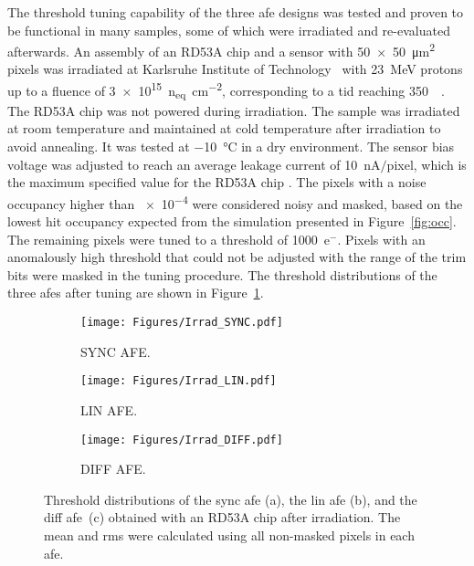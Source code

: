 The threshold tuning capability of the three \gls{afe} designs was tested and proven to be functional in many samples, some of which were irradiated and re-evaluated afterwards. An assembly of an RD53A chip and a sensor with \SI[product-units = power]{50x50}{\micro\meter\squared} pixels was irradiated at Karlsruhe Institute of Technology~\citep{kit} with \SI{23}{\mega\electronvolt} protons up to a fluence of \SI{3e15}{n_{eq}\per\centi\meter\squared}, corresponding to a \gls{tid} reaching \SI{350}{\mega\rad}. The RD53A chip was not powered during irradiation. The sample was irradiated at room temperature and maintained at cold temperature after irradiation to avoid annealing. It was tested at \SI{-10}{\celsius} in a dry environment. The sensor bias voltage was adjusted to reach an average leakage current of \SI{10}{\nano\ampere}$/$pixel, which is the maximum specified value for the RD53A chip \cite{rd53a_specs}.
The pixels with a noise occupancy higher than \num{e-4} were considered noisy and masked, based on the lowest hit occupancy expected from the simulation presented in Figure~\ref{fig:occ}. The remaining pixels were tuned to a threshold of \num{1000}~e${^{-}}$. Pixels with an anomalously high threshold that could not be adjusted with the range of the trim bits were masked in the tuning procedure. The threshold distributions of the three \gls{afe}s after tuning are shown in Figure~\ref{fig:irrad_3afes_thr}.

\begin{figure}[t]
    \centering
    \begin{subfigure}{0.32\textwidth}
        \centering
        \texttt{[image: Figures/Irrad\_SYNC.pdf]}
        \caption{SYNC AFE.}
    \end{subfigure}
    \hfill
    \begin{subfigure}{0.32\textwidth}
        \centering
        \texttt{[image: Figures/Irrad\_LIN.pdf]}
        \caption{LIN AFE.}
    \end{subfigure}
    \hfill
    \begin{subfigure}{0.32\textwidth}
        \centering
        \texttt{[image: Figures/Irrad\_DIFF.pdf]}
        \caption{DIFF AFE.}
    \end{subfigure}
    \caption{Threshold distributions of the \gls{sync} \gls{afe} (a), the \gls{lin} \gls{afe} (b), and the \gls{diff} \gls{afe}~(c) obtained with an RD53A chip after irradiation. The mean and \gls{rms} were calculated using all non-masked pixels in each \gls{afe}.}
    \label{fig:irrad_3afes_thr}
\end{figure}

